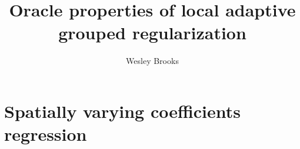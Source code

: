 \documentclass[authoryear, review, 11pt]{elsarticle}
\title{Oracle properties of local adaptive grouped regularization}
\author{Wesley Brooks}
\date{}                                           %
\begin{document}

\maketitle



\section{Spatially varying coefficients regression \label{section:SVCR}}
\end{document}
